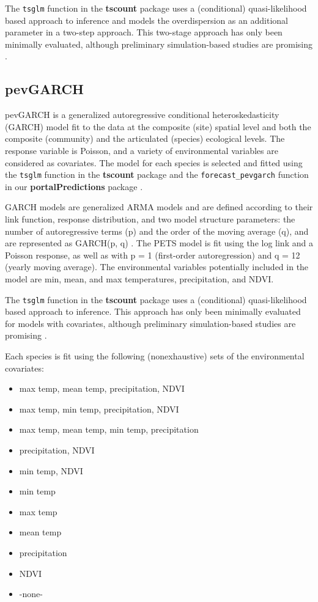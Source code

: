 \documentclass{article}
\def\code#1{\texttt{#1}}
\begin{document}
The \code{tsglm} function in the \textbf{tscount} package \citep{Liboschik2017a} uses a (conditional) quasi-likelihood based approach to inference and models the overdispersion as an additional parameter in a two-step approach. This two-stage approach has only been minimally evaluated, although preliminary simulation-based studies are promising \citep{Liboschik2017b}.    

\subsection{pevGARCH}
\label{subsec:currmods_pevgarch}

pevGARCH is a generalized autoregressive conditional heteroskedasticity (GARCH) model fit to the data at the composite (site) spatial level and both the composite (community) and the articulated (species) ecological levels. The response variable is Poisson, and a variety of environmental variables are considered as covariates. The model for each species is selected and fitted using the \code{tsglm} function in the \textbf{tscount} package \citep{Liboschik2017a} and the \code{forecast\_pevgarch} function in our \textbf{portalPredictions} package \citep{PortalPredictions}.

GARCH models are generalized ARMA models and are defined according to their link function, response distribution, and two model structure parameters: the number of autoregressive terms (p) and the order of the moving average (q), and are represented as GARCH(p, q) \citep{Liboschik2017a}. The PETS model is fit using the log link and a Poisson response, as well as with p = 1 (first-order autoregression) and q = 12 (yearly moving average). The environmental variables potentially included in the model are min, mean, and max temperatures, precipitation, and NDVI. 

The \code{tsglm} function in the \textbf{tscount} package \citep{Liboschik2017a} uses a (conditional) quasi-likelihood based approach to inference. This approach has only been minimally evaluated for models with covariates, although preliminary simulation-based studies are promising \citep{Liboschik2017b}.  

Each species is fit using the following (nonexhaustive) sets of the environmental covariates:
\begin{itemize}
\item max temp, mean temp, precipitation, NDVI
\item max temp, min temp, precipitation, NDVI
\item max temp, mean temp, min temp, precipitation
\item precipitation, NDVI
\item min temp, NDVI
\item min temp
\item max temp
\item mean temp
\item precipitation 
\item NDVI
\item -none-
\end{itemize}
\end{document}
